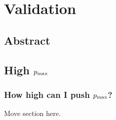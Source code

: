%
\chapter{Validation}
\section{Abstract}\label{sec:primordial_abstract}
\section{High $p_\text{max}$}\label{sec:high_pmax}
\subsection{How high can I push $p_\text{max}$?}
Move section here.

